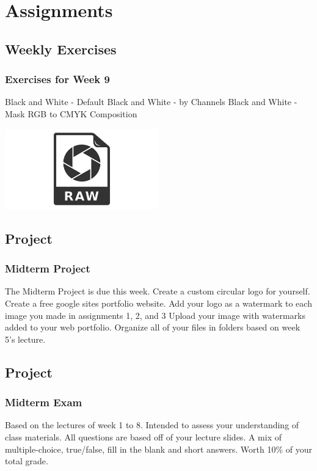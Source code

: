 \documentclass{beamer}
\begin{document}
		\section{Assignments}
			\subsection{Weekly Exercises}		
			\begin{frame}
				\frametitle{Exercises for Week 9}
				\begin{outline}
					\1 Black and White - Default
					\1 Black and White - by Channels
					\1 Black and White - Mask
					\1 RGB to CMYK
					\1 Composition
				\end{outline}
				\includegraphics[width=0.5\textwidth]{images/raw.jpg}
			\end{frame}
		
		\subsection{Project}		
			\begin{frame}
				\frametitle{Midterm Project}
				\begin{outline}
					\1 The Midterm Project is due this week.
					\1 Create a custom circular logo for yourself.
					\1 Create a free google sites portfolio website.  
					\1 Add your logo as a watermark to each image you made in assignments 1,  2, and 3
					\1 Upload your image with watermarks added to your web portfolio.  
					\1 Organize all of your files in folders based on week 5's lecture.
				\end{outline}
			\end{frame}

		\subsection{Project}		
			\begin{frame}
				\frametitle{Midterm Exam}
				\begin{outline}
					\1 Based on the lectures of week 1 to 8.
					\1 Intended to assess your understanding of class materials.
					\1 All questions are based off of your lecture slides.
					\1 A mix of multiple-choice, true/false, fill in the blank and short answers.
					\1 Worth 10\% of your total grade.
				\end{outline}
			\end{frame}
	
\end{document}

